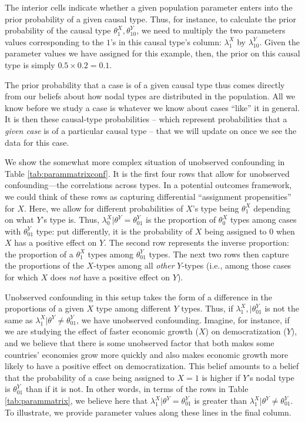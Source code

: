 \documentclass[12pt,]{book}
\begin{document}
The interior cells indicate whether a given population parameter enters into the prior probability of a given causal type. Thus, for instance, to calculate the prior probability of the causal type \(\theta^X_1, \theta^Y_{10}\), we need to multiply the two parameters values corresponding to the \(1\)'s in this causal type's column: \(\lambda^X_1\) by \(\lambda^Y_{10}\). Given the parameter values we have assigned for this example, then, the prior on this causal type is simply \(0.5 \times 0.2 = 0.1\).

The prior probability that a case is of a given causal type thus comes directly from our beliefs about how nodal types are distributed in the population. All we know before we study a case is whatever we know about cases ``like'' it in general. It is then these causal-type probabilities -- which represent probabilities that a \emph{given case} is of a particular causal type -- that we will update on once we see the data for this case.

We show the somewhat more complex situation of unobserved confounding in Table \ref{tab:parammatrixconf}. It is the first four rows that allow for unobserved confounding---the correlations across types. In a potential outcomes framework, we could think of these rows as capturing differential ``assignment propensities'' for \(X\). Here, we allow for different probabilities of \(X\)'s type being \(\theta^X_1\) depending on what \(Y\)'s type is. Thus, \(\lambda^X_0 | \theta^Y= \theta^Y_{01}\) is the proportion of \(\theta^X_0\) types among cases with \(\theta^Y_{01}\) type: put differently, it is the probability of \(X\) being assigned to \(0\) when \(X\) has a positive effect on \(Y\). The second row represents the inverse proportion: the proportion of a \(\theta^X_1\) types among \(\theta^Y_{01}\) types. The next two rows then capture the proportions of the \(X\)-types among all \emph{other} \(Y\)-types (i.e., among those cases for which \(X\) does \emph{not} have a positive effect on \(Y\)).

Unobserved confounding in this setup takes the form of a difference in the proportions of a given \(X\) type among different \(Y\) types. Thus, if \(\lambda^X_1, | \theta^Y_{01}\) is not the same as \(\lambda^X_1 | \theta^Y \neq \theta^Y_{01}\), we have unobserved confounding. Imagine, for instance, if we are studying the effect of faster economic growth (\(X\)) on democratization (\(Y\)), and we believe that there is some unobserved factor that both makes some countries' economies grow more quickly and also makes economic growth more likely to have a positive effect on democratization. This belief amounts to a belief that the probability of a case being assigned to \(X=1\) is higher if \(Y\)'s nodal type is \(\theta^Y_{01}\) than if it is not. In other words, in terms of the rows in Table \ref{tab:parammatrix}, we believe here that \(\lambda^X_1 | \theta^Y=\theta^Y_{01}\) is greater than \(\lambda^X_1 | \theta^Y \neq \theta^Y_{01}\). To illustrate, we provide parameter values along these lines in the final column.
\end{document}
